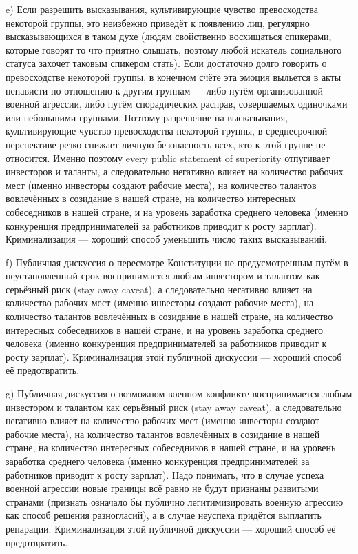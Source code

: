 \documentclass[11pt]{article}
\theoremstyle{remark}
\theoremstyle{definition}
\begin{document}
e) Если разрешить высказывания, культивирующие чувство превосходства некоторой группы, это неизбежно приведёт к появлению лиц, регулярно высказывающихся в таком духе (людям свойственно восхищаться спикерами, которые говорят то что приятно слышать, поэтому любой искатель социального статуса захочет таковым спикером стать). Если достаточно долго говорить о превосходстве некоторой группы, в конечном счёте эта эмоция выльется в акты ненависти по отношению к другим группам --- либо путём организованной военной агрессии, либо путём спорадических расправ, совершаемых одиночками или небольшими группами. Поэтому разрешение на высказывания, культивирующие чувство превосходства некоторой группы, в среднесрочной перспективе резко снижает личную безопасность всех, кто к этой группе не относится. Именно поэтому every public statement of superiority отпугивает инвесторов и таланты, а следовательно негативно влияет на количество рабочих мест (именно инвесторы создают рабочие места), на количество талантов вовлечённых в созидание в нашей стране, на количество интересных собеседников в нашей стране, и на уровень заработка среднего человека (именно конкуренция предпринимателей за работников приводит к росту зарплат). Криминализация --- хороший способ уменьшить число таких высказываний.















f) Публичная дискуссия о пересмотре Конституции не предусмотренным путём в неустановленный срок воспринимается любым инвестором и талантом как серьёзный риск (stay away caveat), а следовательно негативно влияет на количество рабочих мест (именно инвесторы создают рабочие места), на количество талантов вовлечённых в созидание в нашей стране, на количество интересных собеседников в нашей стране, и на уровень заработка среднего человека (именно конкуренция предпринимателей за работников приводит к росту зарплат). Криминализация этой публичной дискуссии --- хороший способ её предотвратить.



g) Публичная дискуссия о возможном военном конфликте воспринимается любым инвестором и талантом как серьёзный риск (stay away caveat), а следовательно негативно влияет на количество рабочих мест (именно инвесторы создают рабочие места), на количество талантов вовлечённых в созидание в нашей стране, на количество интересных собеседников в нашей стране, и на уровень заработка среднего человека (именно конкуренция предпринимателей за работников приводит к росту зарплат). Надо понимать, что в случае успеха военной агрессии новые границы всё равно не будут признаны развитыми странами (признать означало бы публично легитимизировать военную агрессию как способ решения разногласий), а в случае неуспеха придётся выплатить репарации. Криминализация этой публичной дискуссии --- хороший способ её предотвратить.
\end{document}
